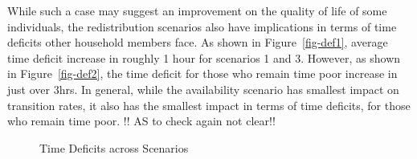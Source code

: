 \documentclass[
  11pt,
]{article}
\begin{document}
While such a case may suggest an improvement on the quality of life of
some individuals, the redistribution scenarios also have implications in
terms of time deficits other household members face. As shown in
Figure~\ref{fig-def1}, average time deficit increase in roughly 1 hour
for scenarios 1 and 3. However, as shown in Figure~\ref{fig-def2}, the
time deficit for those who remain time poor increase in just over 3hrs.
In general, while the availability scenario has smallest impact on
transition rates, it also has the smallest impact in terms of time
deficits, for those who remain time poor. !! AS to check again not
clear!!

\begin{figure}[H]


\caption{\label{fig-deficit}Time Deficits across Scenarios}

\end{figure}%
\end{document}
